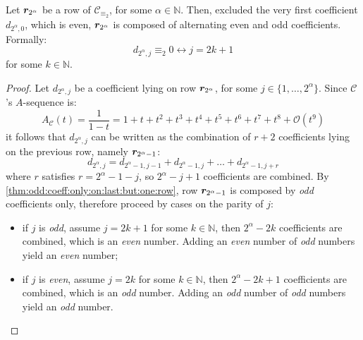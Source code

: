 \begin{theorem}
    Let $\boldsymbol{r}_{2^{\alpha}}$ be a row of $\mathcal{C}_{\equiv_{2}}$, 
    for some $\alpha\in\mathbb{N}$. Then, excluded the very first coefficient 
    $d_{2^{\alpha},0}$, which is even, $\boldsymbol{r}_{2^{\alpha}}$ is composed of
    alternating even and odd coefficients. Formally:
    \begin{displaymath}
        d_{2^{\alpha},j}\equiv_{2}0 \leftrightarrow j = 2k+1
    \end{displaymath}
    for some $k\in\mathbb{N}$.
\end{theorem}

\begin{proof}
    Let $d_{2^{\alpha},j}$ be a coefficient lying on row $\boldsymbol{r}_{2^{\alpha}}$,
    for some $j\in\lbrace1,\ldots,2^{\alpha}\rbrace$. Since $\mathcal{C}$'s $A$-sequence is:
    \begin{displaymath}
        A_{\mathcal{C}}(t)=\frac{1}{1-t}=1+t+t^{2}+t^{3}+t^{4}+t^{5}+t^{6}+t^{7}+t^{8}+
            \mathcal{O}(t^{9})
    \end{displaymath}
    it follows that $d_{2^{\alpha},j}$ can be written as the combination of $r+2$
    coefficients lying on the previous row, namely $\boldsymbol{r}_{2^{\alpha}-1}$:
    \begin{displaymath}
        d_{2^{\alpha},j} = d_{2^{\alpha}-1,j-1} +d_{2^{\alpha}-1,j} +\ldots+d_{2^{\alpha}-1,j+r} 
    \end{displaymath}
    where $r$ satisfies $r=2^{\alpha}-1-j$, so $2^{\alpha}-j+1$ coefficients are 
    combined.  By \autoref{thm:odd:coeff:only:on:last:but:one:row}, 
    row $\boldsymbol{r}_{2^{\alpha}-1}$ is composed by \emph{odd}
    coefficients only, therefore proceed by cases on the parity of $j$:
    \begin{itemize}
        \item if $j$ is \emph{odd}, assume $j=2k+1$ for some $k\in\mathbb{N}$, then
            $2^{\alpha}-2k$ coefficients are combined, which is an \emph{even} number. 
            Adding an \emph{even} number of \emph{odd} numbers yield an \emph{even} number;
        \item if $j$ is \emph{even}, assume $j=2k$ for some $k\in\mathbb{N}$, then
            $2^{\alpha}-2k+1$ coefficients are combined, which is an \emph{odd} number. 
            Adding an \emph{odd} number of \emph{odd} numbers yield an \emph{odd} number.
    \end{itemize}
\end{proof}

